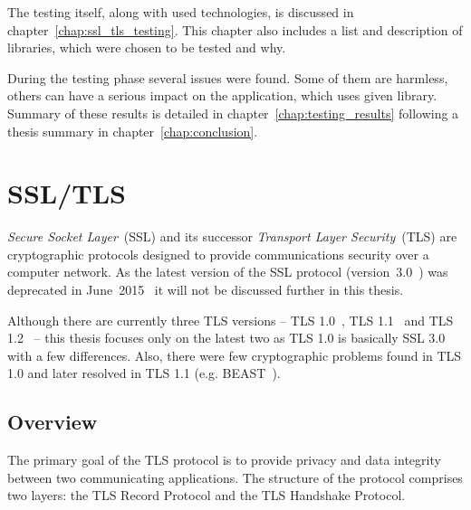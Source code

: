     The testing itself, along with used technologies, is discussed in
    chapter~\ref{chap:ssl_tls_testing}. This chapter also includes a list
    and description of libraries, which were chosen to be tested and why.

    During the testing phase several issues were found. Some of them are harmless,
    others can have a serious impact on the application, which uses given library.
    Summary of these results is detailed in chapter~\ref{chap:testing_results}
    following a thesis summary in chapter~\ref{chap:conclusion}.


\chapter{SSL/TLS} \label{chap:ssl_tls}
    \textit{Secure Socket Layer}~(SSL) and its successor
    \textit{Transport Layer Security}~(TLS) are cryptographic protocols
    designed to provide communications security over a computer network. As
    the latest version of the SSL protocol (version~3.0~\cite{rfc6101}) was
    deprecated in June~2015~\cite{rfc7568} it will not be discussed
    further in this thesis.

    Although there are currently three TLS versions -- TLS 1.0~\cite{rfc2246},
    TLS 1.1~\cite{rfc4346} and TLS 1.2~\cite{rfc5246} -- this thesis focuses
    only on the latest two as TLS 1.0 is basically SSL 3.0 with a few
    differences. Also, there were few cryptographic problems found
    in TLS 1.0 and later resolved in TLS 1.1 (e.g. BEAST~\cite{duong2011}).

\section{Overview}\label{ref:overview}
    The primary goal of the TLS protocol is to provide privacy and data
    integrity between two communicating applications. The structure of
    the protocol comprises two layers: the TLS Record Protocol and
    the TLS Handshake Protocol.

